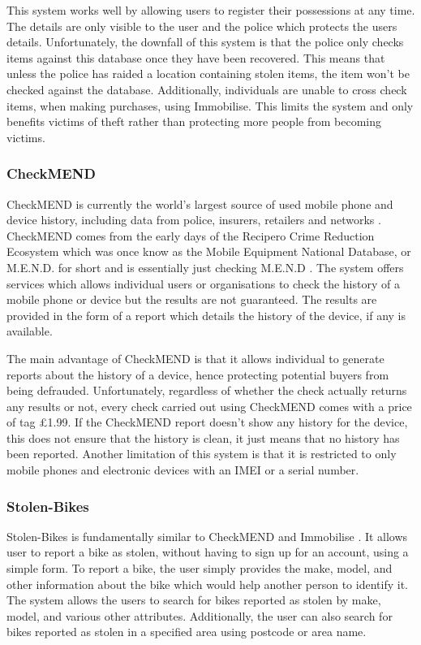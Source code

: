 This system works well by allowing users to register their possessions at any time. The details are only visible to the user and the police which protects the users details. Unfortunately, the downfall of this system is that the police only checks items against this database once they have been recovered. This means that unless the police has raided a location containing stolen items, the item won’t be checked against the database. Additionally, individuals are unable to cross check items, when making purchases, using Immobilise. This limits the system and only benefits victims of theft rather than protecting more people from becoming victims.

\subsubsection{CheckMEND} \label{Section:CheckMEND}
CheckMEND is currently the world's largest source of used mobile phone and device history, including data from police, insurers, retailers and networks \cite{CheckMEND:Home}. CheckMEND comes from the early days of the Recipero Crime Reduction Ecosystem which was once know as the Mobile Equipment National Database, or M.E.N.D. for short and is essentially just checking M.E.N.D \cite{CheckMEND:Home}. The system offers services which allows individual users or organisations to check the history of a mobile phone or device but the results are not guaranteed. The results are provided in the form of a report which details the history of the device, if any is available.

The main advantage of CheckMEND is that it allows individual to generate reports about the history of a device, hence protecting potential buyers from being defrauded. Unfortunately, regardless of whether the check actually returns any results or not, every check carried out using CheckMEND comes with a price of tag \pounds1.99. If the CheckMEND report doesn't show any history for the device, this does not ensure that the history is clean, it just means that no history has been reported. Another limitation of this system is that it is restricted to only mobile phones and electronic devices with an IMEI or a serial number.

\subsubsection{Stolen-Bikes} \label{Section:Stolen-Bikes}
Stolen-Bikes is fundamentally similar to CheckMEND and Immobilise \cite{StolenBikes:Home}. It allows user to report a bike as stolen, without having to sign up for an account, using a simple form. To report a bike, the user simply provides the make, model, and other information about the bike which would help another person to identify it. The system allows the users to search for bikes reported as stolen by make, model, and various other attributes. Additionally, the user can also search for bikes reported as stolen in a specified area using postcode or area name.

